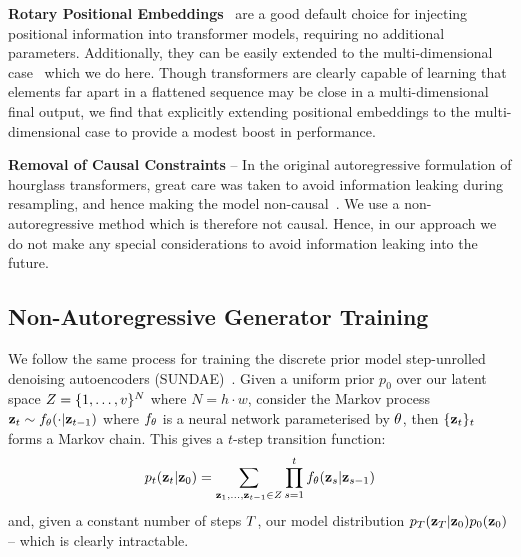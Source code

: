 
\textbf{Rotary Positional Embeddings}~\cite{su2021roformer} are a good default
choice for injecting positional information into transformer models, requiring
no additional parameters. Additionally, they can be easily extended to the
multi-dimensional case~\cite{rope-eleutherai} which we do here. Though
transformers are clearly capable of learning that elements far apart in a
flattened sequence may be close in a multi-dimensional final output, we find
that explicitly extending positional embeddings to the multi-dimensional case to
provide a modest boost in performance.


\textbf{Removal of Causal Constraints} -- In the original autoregressive
formulation of hourglass transformers, great care was taken to avoid information
leaking during resampling, and hence making the model
non-causal~\cite{nawrot2021hierarchical}. We use a non-autoregressive method
which is therefore not causal. Hence, in our approach we do not make any special
considerations to avoid information leaking into the future.

\subsection{Non-Autoregressive Generator Training}

We follow the same process for training the discrete prior model step-unrolled
denoising autoencoders (SUNDAE)~\cite{savinov2022stepunrolled}. Given a uniform
prior $p_0$ over our latent space $Z = \{1, \dots,
v\}^N$ where $N=h\cdot w$, consider the Markov process
$\mathbf{z}_t \sim f_\theta(\cdot \vert \mathbf{z}_{t-1})$ where $f_\theta$ is a neural
network
parameterised by $\theta$, then $\{\mathbf{z}_t\}_t$ forms a Markov
chain. This gives a $t$-step transition function:
\begin{equation}\label{eq:markov}
    p_t(\mathbf{z}_t \vert \mathbf{z}_0) = \sum\limits_{\mathbf{z}_1, \dots,
    \mathbf{z}_{t-1} \in Z} \prod\limits^t_{s=1} f_\theta(\mathbf{z}_s | \mathbf{z}_{s-1})
\end{equation}\cite{savinov2022stepunrolled}
and, given a constant number of steps $T$, our model distribution
$p_T(\mathbf{z}_T \vert \mathbf{z}_0)p_0(\mathbf{z}_0)$ -- which is
clearly intractable.

